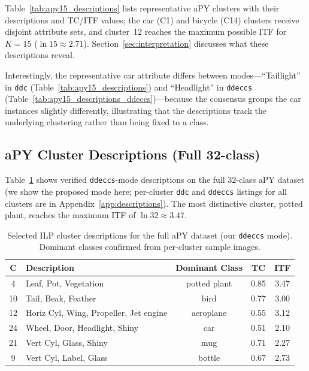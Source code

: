 
Table~\ref{tab:apy15_descriptions} lists representative aPY clusters with their descriptions and TC/ITF values; the car (C1) and bicycle (C14) clusters receive disjoint attribute sets, and cluster~12 reaches the maximum possible ITF for $K = 15$ ($\ln 15 \approx 2.71$). Section~\ref{sec:interpretation} discusses what these descriptions reveal.

Interestingly, the representative car attribute differs between modes---``Taillight'' in \texttt{ddc} (Table~\ref{tab:apy15_descriptions}) and ``Headlight'' in \texttt{ddeccs} (Table~\ref{tab:apy15_descriptions_ddeccs})---because the consensus groups the car instances slightly differently, illustrating that the descriptions track the underlying clustering rather than being fixed to a class.

\subsection{aPY Cluster Descriptions (Full 32-class)}

Table~\ref{tab:apy32_descriptions_ddeccs} shows verified \texttt{ddeccs}-mode descriptions on the full 32-class aPY dataset (we show the proposed mode here; per-cluster \texttt{ddc} and \texttt{ddeccs} listings for all clusters are in Appendix~\ref{app:descriptions}). The most distinctive cluster, potted plant, reaches the maximum ITF of $\ln 32 \approx 3.47$.

\begin{table}[H]
    \centering
    \caption{Selected ILP cluster descriptions for the full aPY dataset (our \texttt{ddeccs} mode). Dominant classes confirmed from per-cluster sample images.}
    \label{tab:apy32_descriptions_ddeccs}
    \begin{tabular}{clccc}
        \hline
        \textbf{C} & \textbf{Description} & \textbf{Dominant Class} & \textbf{TC} & \textbf{ITF} \\
        \hline
        4 & Leaf, Pot, Vegetation & potted plant & 0.85 & 3.47 \\
        10 & Tail, Beak, Feather & bird & 0.77 & 3.00 \\
        12 & Horiz Cyl, Wing, Propeller, Jet engine & aeroplane & 0.55 & 3.12 \\
        24 & Wheel, Door, Headlight, Shiny & car & 0.51 & 2.10 \\
        21 & Vert Cyl, Glass, Shiny & mug & 0.71 & 2.27 \\
        9 & Vert Cyl, Label, Glass & bottle & 0.67 & 2.73 \\
        \hline
    \end{tabular}
\end{table}

